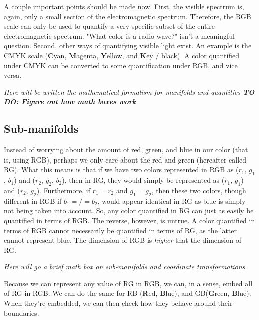 \documentclass{book}
\begin{document}
A couple important points should be made now. First, the visible spectrum is, again, only a small section of the electromagnetic spectrum. Therefore, the RGB scale can only be used to quantify a very specific subset of the entire electromagnetic spectrum. "What color is a radio wave?" isn't a meaningful question. Second, other ways of quantifying visible light exist. An example is the CMYK scale (\textbf{C}yan, \textbf{M}agenta, \textbf{Y}ellow, and \textbf{K}ey / black). A color quantified under CMYK can be converted to some quantification under RGB, and vice versa. 

\emph{Here will be written the mathematical formalism for manifolds and quantities
	\textbf{TO DO: Figure out how math boxes work}}


\subsection{Sub-manifolds}

Instead of worrying about the amount of red, green, and blue in our color (that is, using RGB), perhaps we only care about the red and green (hereafter called RG). What this means is that if we have two colors represented in RGB as ($r_{1}$, $g_{1}$, $b_{1}$) and ($r_{2}$, $g_{2}$, $b_{2}$), then in RG, they would simply be represented as ($r_{1}$, $g_{1}$) and ($r_{2}$, $g_{2}$). Furthermore, if $r_{1} = r_{2}$ and $g_{1} = g_{2}$, then these two colors, though different in RGB if $b_{1} =/= b_{2}$, would appear identical in RG as blue is simply not being taken into account. So, any color quantified in RG can just as easily be quantified in terms of RGB. The reverse, however, is untrue. A color quantified in terms of RGB cannot necessarily be quantified in terms of RG, as the latter cannot represent blue. The dimension of RGB is \textit{higher} that the dimension of RG. 

\emph{Here will go a brief math box on sub-manifolds and coordinate transformations}

Because we can represent any value of RG in RGB, we can, in a sense, embed all of RG in RGB. We can do the same for RB (\textbf{R}ed, \textbf{B}lue), and GB(\textbf{G}reen, \textbf{B}lue). When they're embedded, we can then check how they behave around their boundaries. 
\end{document}
